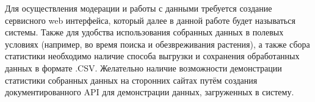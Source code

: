 \tab
Для осуществления модерации и работы с данными требуется создание сервисного web интерфейса, который далее в данной работе будет называться  системы.
Также для удобства использования собранных данных в полевых условиях (например, во время поиска и обезвреживания растения), а также сбора статистики необходимо наличие способа выгрузки и сохранения обработанных данных в формате .CSV.
Желательно наличие возможности демонстрации статистики собранных данных на сторонних сайтах путём создания документированного API для демонстрации данных, загруженных в систему.
